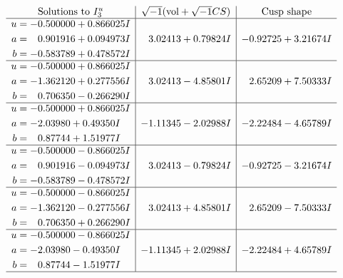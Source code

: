 \documentclass[1p]{elsarticle_modified}
\theoremstyle{definition}
\newcommand{\I}{\sqrt{-1}}
\begin{document}
$$\begin{array}{c|c|c}  
\text{Solutions to }I^u_{3}& \I (\text{vol} + \sqrt{-1}CS) & \text{Cusp shape}\\
 \hline 
\begin{aligned}
u &= -0.500000 + 0.866025 I \\
a &= \phantom{-}0.901916 + 0.094973 I \\
b &= -0.583789 + 0.478572 I\end{aligned}
 & \phantom{-}3.02413 + 0.79824 I & -0.92725 + 3.21674 I \\ \hline\begin{aligned}
u &= -0.500000 + 0.866025 I \\
a &= -1.362120 + 0.277556 I \\
b &= \phantom{-}0.706350 - 0.266290 I\end{aligned}
 & \phantom{-}3.02413 - 4.85801 I & \phantom{-}2.65209 + 7.50333 I \\ \hline\begin{aligned}
u &= -0.500000 + 0.866025 I \\
a &= -2.03980 + 0.49350 I \\
b &= \phantom{-}0.87744 + 1.51977 I\end{aligned}
 & -1.11345 - 2.02988 I & -2.22484 - 4.65789 I \\ \hline\begin{aligned}
u &= -0.500000 - 0.866025 I \\
a &= \phantom{-}0.901916 - 0.094973 I \\
b &= -0.583789 - 0.478572 I\end{aligned}
 & \phantom{-}3.02413 - 0.79824 I & -0.92725 - 3.21674 I \\ \hline\begin{aligned}
u &= -0.500000 - 0.866025 I \\
a &= -1.362120 - 0.277556 I \\
b &= \phantom{-}0.706350 + 0.266290 I\end{aligned}
 & \phantom{-}3.02413 + 4.85801 I & \phantom{-}2.65209 - 7.50333 I \\ \hline\begin{aligned}
u &= -0.500000 - 0.866025 I \\
a &= -2.03980 - 0.49350 I \\
b &= \phantom{-}0.87744 - 1.51977 I\end{aligned}
 & -1.11345 + 2.02988 I & -2.22484 + 4.65789 I\\
 \hline 
 \end{array}$$\newpage
\end{document}
